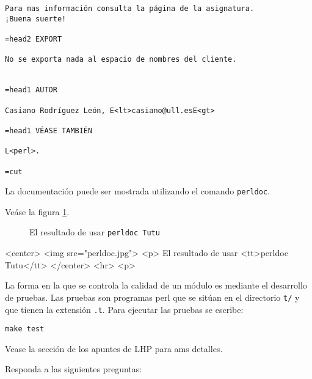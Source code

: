 \begin{verbatim}
Para mas información consulta la página de la asignatura.
¡Buena suerte!

=head2 EXPORT

No se exporta nada al espacio de nombres del cliente.


=head1 AUTOR

Casiano Rodríguez León, E<lt>casiano@ull.esE<gt>

=head1 VÉASE TAMBIÉN

L<perl>.

=cut
\end{verbatim}
La documentación puede ser mostrada utilizando el comando \verb|perldoc|.

\begin{latexonly}
Veáse la figura \ref{fig:perldoc}.

\begin{figure}[htb]
\caption{El resultado de usar {\tt perldoc Tutu}}
\label{fig:perldoc}
\end{figure}
\end{latexonly}

\begin{rawhtml}
<center>
<img src="perldoc.jpg">
<p>
El resultado de usar <tt>perldoc Tutu</tt>
</center>
<hr>
<p>
\end{rawhtml}


La forma en la que se controla la calidad de un módulo es mediante 
el desarrollo de pruebas. Las pruebas son programas perl que se sitúan en el directorio
\verb|t/| y que tienen la extensión \verb|.t|. Para ejecutar las pruebas
se escribe:

\begin{verbatim}
make test
\end{verbatim}

Vease la sección  de los apuntes de LHP para ams detalles.

\label{repaso:lasbases}

Responda a las siguientes preguntas:

